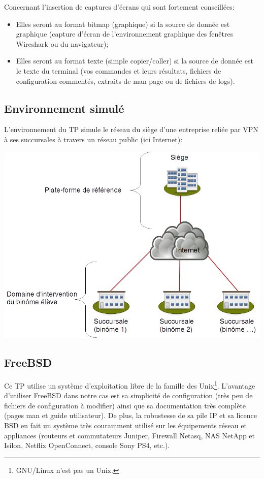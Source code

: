 \documentclass[a4paper,11pt]{article}
\begin{document}
Concernant l'insertion de captures d'écrans qui sont fortement conseillées:
\begin{itemize}
\item Elles seront au format bitmap (graphique) si la source de donnée est graphique (capture d'écran de l'environnement graphique des fenêtres Wireshark ou du navigateur);
\item Elles seront au format texte (simple copier/coller) si la source de donnée est le texte du terminal (vos commandes et leurs résultats, fichiers de configuration commentés, extraits de man page ou de fichiers de logs).
\end{itemize}

\clearpage
\subsection{Environnement simulé}
L'environnement du TP simule le réseau du siège d'une entreprise reliée par VPN à ses succursales à travers un réseau public (ici Internet):
\begin{center}
\includegraphics[width=0.6\linewidth]{environnement-simule}
\end{center}
\subsection{FreeBSD}
Ce TP utilise un système d'exploitation libre de la famille des Unix\footnote{GNU/Linux n'est pas un Unix.}. L'avantage d'utiliser FreeBSD dans notre cas est sa simplicité de configuration (très peu de fichiers de configuration à modifier) ainsi que sa documentation très complète (pages man et guide utilisateur). De plus, la robustesse de sa pile IP et sa licence BSD en fait un système très couramment utilisé sur les équipements réseau et appliances (routeurs et commutateurs Juniper, Firewall Netasq, NAS NetApp et Isilon, Netflix OpenConnect, console Sony PS4, etc.).
\end{document}
